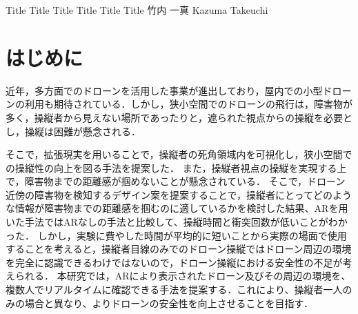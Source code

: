 \documentclass[a4paper,10pt,twocolumn,uplatex]{jsarticle}
\date{1}
\begin{document}
{Title Title Title Title Title Title}
{竹内 一真}
{Kazuma Takeuchi}

\section{はじめに}
近年，多方面でのドローンを活用した事業が進出しており，屋内での小型ドローンの利用も期待されている．しかし，狭小空間でのドローンの飛行は，障害物が多く，操縦者から見えない場所であったりと，遮られた視点からの操縦を必要とし，操縦は困難が懸念される．
\par
そこで，拡張現実を用いることで，操縦者の死角領域内を可視化し，狭小空間での操縦性の向上を図る手法を提案した．
また，操縦者視点の操縦を実現する上で，障害物までの距離感が掴めないことが懸念されている．
そこで，ドローン近傍の障害物を検知するデザイン案を提案することで，操縦者にとってどのような情報が障害物までの距離感を掴むのに適しているかを検討した結果、ARを用いた手法ではARなしの手法と比較して、操縦時間と衝突回数が低いことがわかった．
しかし，実験に費やした時間が平均的に短いことから実際の場面で使用することを考えると，操縦者目線のみでのドローン操縦ではドローン周辺の環境を完全に認識できるわけではないので，ドローン操縦における安全性の不足が考えられる．
本研究では，ARにより表示されたドローン及びその周辺の環境を、複数人でリアルタイムに確認できる手法を提案する．これにより、操縦者一人のみの場合と異なり、よりドローンの安全性を向上させることを目指す．
\end{document}
